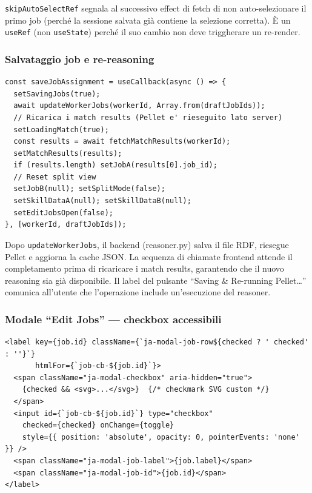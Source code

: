 \documentclass[a4paper,12pt]{article}
\begin{document}
\noindent \texttt{skipAutoSelectRef} segnala al successivo effect di fetch
di non auto-selezionare il primo job (perch\'{e} la sessione salvata
gi\`{a} contiene la selezione corretta). \`{E} un \texttt{useRef}
(non \texttt{useState}) perch\'{e} il suo cambio non deve triggherare
un re-render.

\subsubsection{Salvataggio job e re-reasoning}
\vspace{2pt}
\begin{lstlisting}
const saveJobAssignment = useCallback(async () => {
  setSavingJobs(true);
  await updateWorkerJobs(workerId, Array.from(draftJobIds));
  // Ricarica i match results (Pellet e' rieseguito lato server)
  setLoadingMatch(true);
  const results = await fetchMatchResults(workerId);
  setMatchResults(results);
  if (results.length) setJobA(results[0].job_id);
  // Reset split view
  setJobB(null); setSplitMode(false);
  setSkillDataA(null); setSkillDataB(null);
  setEditJobsOpen(false);
}, [workerId, draftJobIds]);
\end{lstlisting}

\noindent Dopo \texttt{updateWorkerJobs}, il backend (reasoner.py) salva il file
RDF, riesegue Pellet e aggiorna la cache JSON. La sequenza di chiamate
frontend attende il completamento prima di ricaricare i match results,
garantendo che il nuovo reasoning sia gi\`{a} disponibile. Il label
del pulsante ``Saving \& Re-running Pellet\ldots'' comunica all'utente
che l'operazione include un'esecuzione del reasoner.

\subsubsection{Modale ``Edit Jobs'' --- checkbox accessibili}
\vspace{2pt}
\begin{lstlisting}
<label key={job.id} className={`ja-modal-job-row${checked ? ' checked' : ''}`}
       htmlFor={`job-cb-${job.id}`}>
  <span className="ja-modal-checkbox" aria-hidden="true">
    {checked && <svg>...</svg>}  {/* checkmark SVG custom */}
  </span>
  <input id={`job-cb-${job.id}`} type="checkbox"
    checked={checked} onChange={toggle}
    style={{ position: 'absolute', opacity: 0, pointerEvents: 'none' }} />
  <span className="ja-modal-job-label">{job.label}</span>
  <span className="ja-modal-job-id">{job.id}</span>
</label>
\end{lstlisting}
\end{document}
